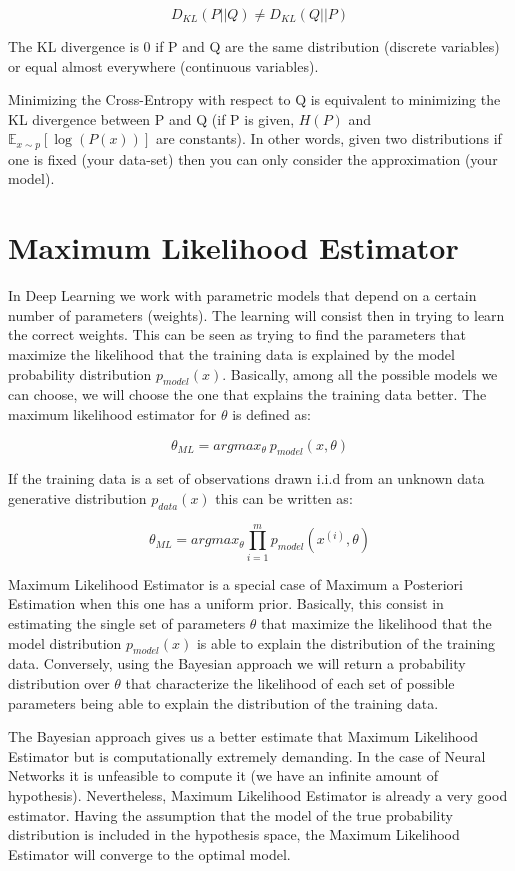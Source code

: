 $$ D_{KL} (P \vert \vert Q) \neq D_{KL} (Q \vert \vert P)$$

\noindent The KL divergence is 0 if P and Q are the same distribution (discrete variables) or equal almost everywhere (continuous variables).

\noindent Minimizing the Cross-Entropy with respect to Q is equivalent to minimizing the KL divergence between P and Q (if P is given, $H(P)$ and $ \mathbb{E}_{x \sim p} \left[ \log(P(x))  \right] $ are constants). In other words, given two distributions if one is fixed (your data-set) then you can only consider the approximation (your model).

\section{Maximum Likelihood Estimator}

In Deep Learning we work with parametric models that depend on a certain number of parameters (weights). The learning will consist then in trying to learn the correct weights. This can be seen as trying to find the parameters that maximize the likelihood that the training data is explained by the model probability distribution $p_{model}(x)$. Basically, among all the possible models we can choose, we will choose the one that explains the training data better. The maximum likelihood estimator for $\theta$ is defined as:

$$\theta_{ML} = argmax_{\theta} ~ p_{model} (x, \theta) $$

If the training data is a set of observations drawn i.i.d from an unknown data generative distribution $p_{data} (x)$ this can be written as:

$$\theta_{ML} = argmax_{\theta} \prod_{i=1}^{m} p_{model} (x^{(i)}, \theta) $$

\noindent Maximum Likelihood Estimator is a special case of Maximum a Posteriori Estimation when this one has a uniform prior. Basically, this consist in estimating the single set of parameters $\theta$ that maximize the likelihood that the model distribution $p_{model}(x)$ is able to explain the distribution of the training data. Conversely, using the Bayesian approach we will return a probability distribution over $\theta$ that characterize the likelihood of each set of possible parameters being able to explain the distribution of the training data. 

\noindent The Bayesian approach gives us a better estimate that Maximum Likelihood Estimator but is computationally extremely demanding. In the case of Neural Networks it is unfeasible to compute it (we have an infinite amount of hypothesis). Nevertheless, Maximum Likelihood Estimator is already a very good estimator. Having the assumption that the model of the true probability distribution is included in the hypothesis space, the Maximum Likelihood Estimator will converge to the optimal model.


